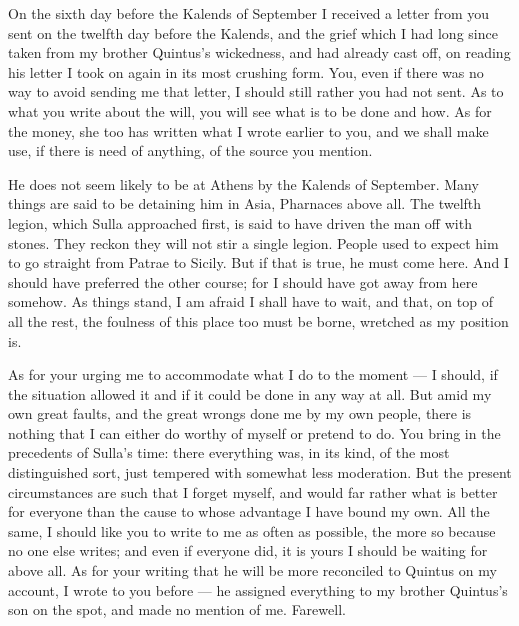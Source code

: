 

 On the sixth day before the Kalends of September I received a letter from you sent on the twelfth day before the Kalends, and the grief which I had long since taken from my brother Quintus's wickedness, and had already cast off, on reading his letter I took on again in its most crushing form. You, even if there was no way to avoid sending me that letter, I should still rather you had not sent. As to what you write about the will, you will see what is to be done and how. As for the money, she too has written what I wrote earlier to you, and we shall make use, if there is need of anything, of the source you mention.

 He does not seem likely to be at Athens by the Kalends of September. Many things are said to be detaining him in Asia, Pharnaces above all. The twelfth legion, which Sulla approached first, is said to have driven the man off with stones. They reckon they will not stir a single legion. People used to expect him to go straight from Patrae to Sicily. But if that is true, he must come here. And I should have preferred \dag the other course\dag; for I should have got away from here somehow. As things stand, I am afraid I shall have to wait, and that, on top of all the rest, the foulness of this place too must be borne, wretched as my position is.

 As for your urging me to accommodate what I do to the moment --- I should, if the situation allowed it and if it could be done in any way at all. But amid my own great faults, and the great wrongs done me by my own people, there is nothing that I can either do worthy of myself or pretend to do. You bring in the precedents of Sulla's time: there everything was, in its kind, of the most distinguished sort, just tempered with somewhat less moderation. But the present circumstances are such that I forget myself, and would far rather what is better for everyone than the cause to whose advantage I have bound my own. All the same, I should like you to write to me as often as possible, the more so because no one else writes; and even if everyone did, it is yours I should be waiting for above all. As for your writing that he will be more reconciled to Quintus on my account, I wrote to you before --- he assigned everything to my brother Quintus's son on the spot, and made no mention of me. Farewell.
